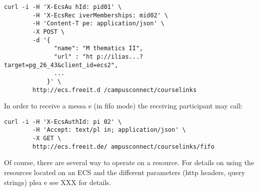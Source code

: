 \begin{verbatim}   
curl -i -H 'X-EcsAu hId: pid01' \
        -H 'X-EcsRec iverMemberships: mid02' \
        -H 'Content-T pe: application/json' \
        -X POST \      
        -d '{           
              "name": "M thematics II",
              "url" : "ht p://ilias...?target=pg_26_43&client_id=ecs2",
              ...          
            }' \            
        http://ecs.freeit.d /campusconnect/courselinks
\end{verbatim}              
In order to receive a messa e (in fifo mode) the receiving
participant may call:       
\begin{verbatim}            
curl -i -H 'X-EcsAuthId: pi 02' \
        -H 'Accept: text/pl in; application/json' \
        -X GET \             
        http://ecs.freeit.de/ ampusconnect/courselinks/fifo
\end{verbatim}                 
                                
Of course, there are several way  to operate on a resource. For details
on using the resources located on an ECS and the different parameters
(http headers, query strings) plea e see XXX for details.
